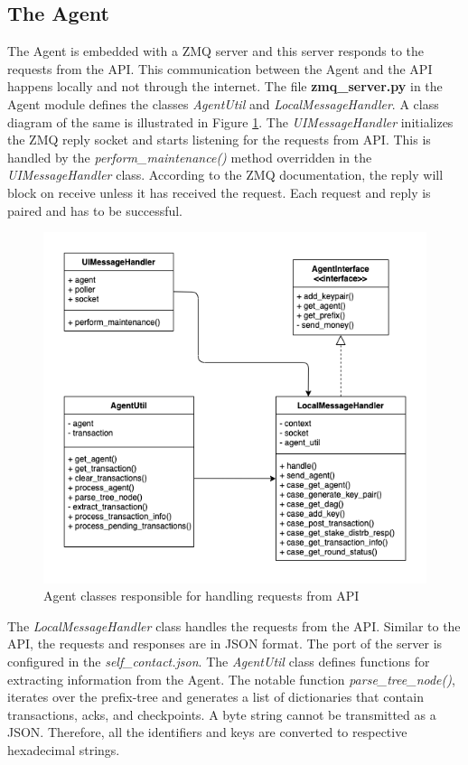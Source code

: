 \subsection{The Agent}
The Agent is embedded with a ZMQ server and this server responds to the requests from the API. This communication between the Agent and the API happens locally and not through the internet. The file \textbf{zmq\_server.py} in the Agent module defines the classes \textit{AgentUtil} and \textit{LocalMessageHandler}. A class diagram of the same is illustrated in Figure \ref{fig:ramu_agent_class}. The \textit{UIMessageHandler} initializes the ZMQ reply socket and starts listening for the requests from API. This is handled by the \textit{perform\_maintenance()} method overridden in the \textit{UIMessageHandler} class. According to the ZMQ documentation, the reply will block on receive unless it has received the request. Each request and reply is paired and has to be successful.

\begin{figure}[htbp]
    \centering
    \includegraphics[width=0.9\linewidth]{figures/images/ramu/agent_class.png}
	\caption{Agent classes responsible for handling requests from API}
	\label{fig:ramu_agent_class}
\end{figure}

The \textit{LocalMessageHandler} class handles the requests from the API. Similar to the API, the requests and responses are in JSON format. The port of the server is configured in the \textit{self\_contact.json}. The \textit{AgentUtil} class defines functions for extracting information from the Agent. The notable function \textit{parse\_tree\_node()}, iterates over the prefix-tree and generates a list of dictionaries that contain transactions, acks, and checkpoints. A byte string cannot be transmitted as a JSON. Therefore, all the identifiers and keys are converted to respective hexadecimal strings. 

